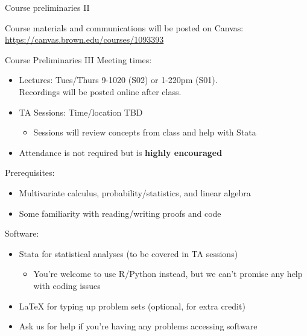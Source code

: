 \documentclass[11pt,english,handout]{beamer}
\begin{document}
\begin{frame}{Course preliminaries II}

Course materials and communications will be posted on Canvas: {\url{https://canvas.brown.edu/courses/1093393}}

\end{frame}

\begin{frame}{Course Preliminaries III}
\vspace{0.2cm}
Meeting times:

\begin{itemize}
\item Lectures: Tues/Thurs 9-1020 (S02) or 1-220pm (S01).\\ Recordings will be posted online after class.
\vspace{0.1cm}
\item TA Sessions: Time/location TBD
\begin{itemize}
	\item 
	Sessions will review concepts from class and help with Stata
\end{itemize}

\vspace{0.1cm}
\item Attendance is not required but is \textbf{highly encouraged}
\end{itemize}
\vspace{0.3cm}

\pause{}

Prerequisites:

\begin{itemize}
\item Multivariate calculus, probability/statistics, and linear algebra
\vspace{0.1cm}
\item Some familiarity with reading/writing proofs and code
\end{itemize}
\vspace{0.2cm}

\pause{}

Software:

\begin{itemize}
\item Stata for statistical analyses (to be covered in TA sessions)
	\begin{itemize}
		\item 
		You're welcome to use R/Python instead, but we can't promise any help with coding issues
	\end{itemize}
\vspace{0.1cm}
\item LaTeX for typing up problem sets (optional, for extra credit)
\vspace{0.1cm}
\item Ask us for help if you're having any problems accessing software
\end{itemize}

\end{frame}
\end{document}

